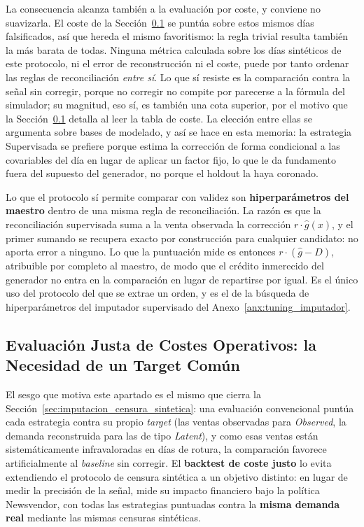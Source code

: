 La consecuencia alcanza también a la evaluación por coste, y conviene no suavizarla. El coste de la Sección~\ref{sec:resultados_gemelo} se puntúa sobre estos mismos días falsificados, así que hereda el mismo favoritismo: la regla trivial resulta también la más barata de todas. Ninguna métrica calculada sobre los días sintéticos de este protocolo, ni el error de reconstrucción ni el coste, puede por tanto ordenar las reglas de reconciliación \emph{entre sí}. Lo que sí resiste es la comparación contra la señal sin corregir, porque no corregir no compite por parecerse a la fórmula del simulador; su magnitud, eso sí, es también una cota superior, por el motivo que la Sección~\ref{sec:resultados_gemelo} detalla al leer la tabla de coste. La elección entre ellas se argumenta sobre bases de modelado, y así se hace en esta memoria: la estrategia Supervisada se prefiere porque estima la corrección de forma condicional a las covariables del día en lugar de aplicar un factor fijo, lo que le da fundamento fuera del supuesto del generador, no porque el holdout la haya coronado.

Lo que el protocolo sí permite comparar con validez son \textbf{hiperparámetros del maestro} dentro de una misma regla de reconciliación. La razón es que la reconciliación supervisada suma a la venta observada la corrección $r\cdot\hat{g}(x)$, y el primer sumando se recupera exacto por construcción para cualquier candidato: no aporta error a ninguno. Lo que la puntuación mide es entonces $r\cdot(\hat{g}-D)$, atribuible por completo al maestro, de modo que el crédito inmerecido del generador no entra en la comparación en lugar de repartirse por igual. Es el único uso del protocolo del que se extrae un orden, y es el de la búsqueda de hiperparámetros del imputador supervisado del Anexo~\ref{anx:tuning_imputador}.

\subsection{Evaluación Justa de Costes Operativos: la Necesidad de un Target Común}
\label{sec:resultados_gemelo}

El sesgo que motiva este apartado es el mismo que cierra la Sección~\ref{sec:imputacion_censura_sintetica}: una evaluación convencional puntúa cada estrategia contra su propio \textit{target} (las ventas observadas para \textit{Observed}, la demanda reconstruida para las de tipo \textit{Latent}), y como esas ventas están sistemáticamente infravaloradas en días de rotura, la comparación favorece artificialmente al \textit{baseline} sin corregir. El \textbf{backtest de coste justo} lo evita extendiendo el protocolo de censura sintética a un objetivo distinto: en lugar de medir la precisión de la señal, mide su impacto financiero bajo la política Newsvendor, con todas las estrategias puntuadas contra la \textbf{misma demanda real} mediante las mismas censuras sintéticas.

